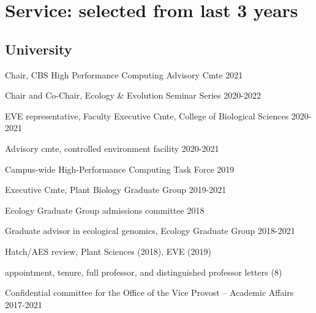\documentclass[letterpaper,10pt]{article}
\renewenvironment{itemize}{
  \begin{list}{}{
    \setlength{\leftmargin}{1.5em}
  }
}{
  \end{list}
}
\begin{document}
\section*{Service: selected from last 3 years}
\begin{itemize}
\setlength\itemsep{0ex}
\subsection*{University}
\item Chair, CBS High Performance Computing Advisory Cmte \hfill2021
\item Chair and Co-Chair, Ecology \& Evolution Seminar Series \hfill2020-2022
\item EVE representative, Faculty Executive Cmte, College of Biological Sciences \hfill2020-2021
\item Advisory cmte, controlled environment facility \hfill2020-2021
\item Campus-wide High-Performance Computing Task Force \hfill2019
\item Executive Cmte, Plant Biology Graduate Group \hfill2019-2021
\item Ecology Graduate Group admissions committee \hfill2018
\item Graduate advisor in ecological genomics, Ecology Graduate Group 2018-2021
\item Hatch/AES review,  Plant Sciences (2018), EVE (2019) %
\item appointment, tenure, full professor,  and distinguished professor letters (8) %
\item Confidential committee for the Office of the Vice Provost – Academic Affairs  \hfill2017-2021 %

\end{itemize}
\end{document}

